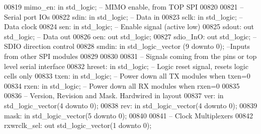 \begin{DoxyCode}
00819         mimo\_en: \textcolor{keywordflow}{in} \textcolor{comment}{std\_logic};  \textcolor{keyword}{-- MIMO enable, from TOP SPI}
00820     
00821 \textcolor{keyword}{        -- Serial port IOs}
00822         sdin: \textcolor{keywordflow}{in} \textcolor{comment}{std\_logic};     \textcolor{keyword}{-- Data in}
00823         sclk: \textcolor{keywordflow}{in} \textcolor{comment}{std\_logic};     \textcolor{keyword}{-- Data clock}
00824         sen: \textcolor{keywordflow}{in} \textcolor{comment}{std\_logic};  \textcolor{keyword}{-- Enable signal (active low)}
00825         sdout: \textcolor{keywordflow}{out} \textcolor{comment}{std\_logic};   \textcolor{keyword}{-- Data out}
00826         oen: \textcolor{keywordflow}{out} \textcolor{comment}{std\_logic};
00827         sdio\_InO: \textcolor{keywordflow}{out} \textcolor{comment}{std\_logic};    \textcolor{keyword}{-- SDIO direction control}
00828         smdin: \textcolor{keywordflow}{in} \textcolor{comment}{std\_logic\_vector} (\textcolor{vhdllogic}{}\textcolor{vhdllogic}{9} \textcolor{keywordflow}{downto} \textcolor{vhdllogic}{}\textcolor{vhdllogic}{0});    \textcolor{keyword}{--Inputs from other SPI modules}
00829 
00830     
00831 \textcolor{keyword}{        -- Signals coming from the pins or top level serial interface}
00832         hreset: \textcolor{keywordflow}{in} \textcolor{comment}{std\_logic};   \textcolor{keyword}{-- Logic reset signal, resets logic cells only}
00833         txen: \textcolor{keywordflow}{in} \textcolor{comment}{std\_logic}; \textcolor{keyword}{-- Power down all TX modules when txen=0}
00834         rxen: \textcolor{keywordflow}{in} \textcolor{comment}{std\_logic}; \textcolor{keyword}{-- Power down all RX modules when rxen=0}
00835 
00836 \textcolor{keyword}{        -- Version, Revision and Mask. Hardwired in layout}
00837         ver: \textcolor{keywordflow}{in} \textcolor{comment}{std\_logic\_vector}(\textcolor{vhdllogic}{}\textcolor{vhdllogic}{4} \textcolor{keywordflow}{downto} \textcolor{vhdllogic}{}\textcolor{vhdllogic}{0});
00838         rev: \textcolor{keywordflow}{in} \textcolor{comment}{std\_logic\_vector}(\textcolor{vhdllogic}{}\textcolor{vhdllogic}{4} \textcolor{keywordflow}{downto} \textcolor{vhdllogic}{}\textcolor{vhdllogic}{0});
00839         mask: \textcolor{keywordflow}{in} \textcolor{comment}{std\_logic\_vector}(\textcolor{vhdllogic}{}\textcolor{vhdllogic}{5} \textcolor{keywordflow}{downto} \textcolor{vhdllogic}{}\textcolor{vhdllogic}{0});
00840         
00841 \textcolor{keyword}{        -- Clock Multiplexers}
00842         rxwrclk\_sel: \textcolor{keywordflow}{out} \textcolor{comment}{std\_logic\_vector}(\textcolor{vhdllogic}{}\textcolor{vhdllogic}{1} \textcolor{keywordflow}{downto} \textcolor{vhdllogic}{}\textcolor{vhdllogic}{0});

\end{DoxyCode}
